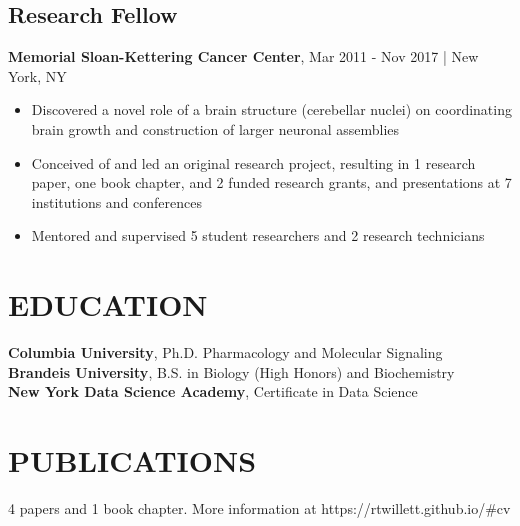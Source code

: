 \documentclass[11pt]{article}
\newenvironment{myitemize}
{ \begin{itemize}
	\setlength{\itemsep}{0pt}
	\setlength{\parskip}{0pt}
	\setlength{\parsep}{0pt}     }
{ \end{itemize}                  }
\begin{document}
\subsection*{Research Fellow}
{\bfseries Memorial Sloan-Kettering Cancer Center}, Mar 2011 - Nov 2017 | New York, NY
\begin{myitemize}
	\item Discovered a novel role of a brain structure (cerebellar nuclei) on coordinating brain growth and construction of larger neuronal assemblies
	\item Conceived of and led an original research project, resulting in 1 research paper, one book chapter, and 2 funded research grants, and presentations at 7 institutions and conferences
	\item Mentored and supervised 5 student researchers and 2 research technicians
\end{myitemize}

\section*{EDUCATION}
{\bfseries Columbia University}, Ph.D. Pharmacology and Molecular Signaling \\
{\bfseries Brandeis University}, B.S. in Biology (High Honors) and Biochemistry \\
{\bfseries New York Data Science Academy}, Certificate in Data Science

\section*{PUBLICATIONS}
4 papers and 1 book chapter. More information at https://rtwillett.github.io/\#cv
\end{document}
